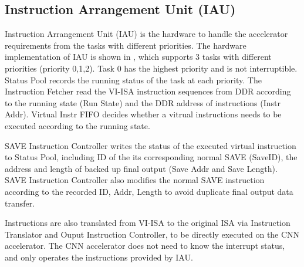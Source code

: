 
\subsection{ Instruction Arrangement Unit (IAU) }

Instruction Arrangement Unit (IAU) is the hardware to handle the accelerator requirements from the tasks with different priorities. 
The hardware implementation of IAU is shown in , which supports 3 tasks with different priorities (priority 0,1,2).
Task 0 has the highest priority and is not interruptible.
Status Pool records the running status of the task at each priority. The Instruction Fetcher read the VI-ISA instruction sequences from DDR according to the running state (Run State) and the DDR address of instructions (Instr Addr). Virtual Instr FIFO decides whether a vitrual instructions needs to be executed according to the running state. 

SAVE Instruction Controller writes the status of the executed virtual instruction to Status Pool, including ID of the its corresponding normal SAVE (SaveID), the address and length of backed up final output (Save Addr and Save Length).
SAVE Instruction Controller also modifies the normal SAVE instruction according to the recorded ID, Addr, Length to avoid duplicate final output data transfer.

Instructions are also translated from VI-ISA to the original ISA via Instruction Translator and Ouput Instruction Controller, to be directly executed on the CNN accelerator. The CNN accelerator does not need to know the interrupt status, and only operates the instructions provided by IAU.

